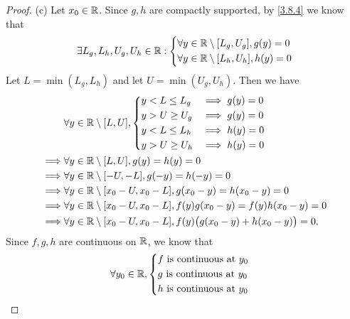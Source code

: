 \begin{proof}{(c)}
  Let \(x_0 \in \mathbb{R}\).
  Since \(g, h\) are compactly supported, by \cref{3.8.4} we know that
  \[
    \exists L_g, L_h, U_g, U_h \in \mathbb{R} : \begin{dcases}
      \forall y \in \mathbb{R} \setminus [L_g, U_g], g(y) = 0 \\
      \forall y \in \mathbb{R} \setminus [L_h, U_h], h(y) = 0
    \end{dcases}
  \]
  Let \(L = \min(L_g, L_h)\) and let \(U = \min(U_g, U_h)\).
  Then we have
  \begin{align*}
             & \forall y \in \mathbb{R} \setminus [L, U], \begin{dcases}
                                                    y < L \leq L_g & \implies g(y) = 0 \\
                                                    y > U \geq U_g & \implies g(y) = 0 \\
                                                    y < L \leq L_h & \implies h(y) = 0 \\
                                                    y > U \geq U_h & \implies h(y) = 0
                                                  \end{dcases}                      \\
    \implies & \forall y \in \mathbb{R} \setminus [L, U], g(y) = h(y) = 0                                         \\
    \implies & \forall y \in \mathbb{R} \setminus [-U, -L], g(-y) = h(-y) = 0                                     \\
    \implies & \forall y \in \mathbb{R} \setminus [x_0 - U, x_0 - L], g(x_0 - y) = h(x_0 - y) = 0                 \\
    \implies & \forall y \in \mathbb{R} \setminus [x_0 - U, x_0 - L], f(y) g(x_0 - y) = f(y) h(x_0 - y) = 0       \\
    \implies & \forall y \in \mathbb{R} \setminus [x_0 - U, x_0 - L], f(y) \big(g(x_0 - y) + h(x_0 - y)\big) = 0.
  \end{align*}
  Since \(f, g, h\) are continuous on \(\mathbb{R}\), we know that
  \begin{align*}
             & \forall y_0 \in \R, \begin{dcases}
                                     f \text{ is continuous at } y_0 \\
                                     g \text{ is continuous at } y_0 \\
                                     h \text{ is continuous at } y_0 \\

\end{dcases}
\end{align*}
\end{proof}
